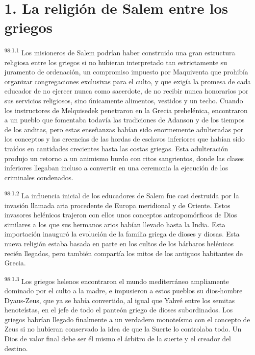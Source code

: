 \section*{1. La religión de Salem entre los griegos}
\par
\textsuperscript{98:1.1} Los misioneros de Salem podrían haber construido una gran estructura religiosa entre los griegos si no hubieran interpretado tan estrictamente su juramento de ordenación, un compromiso impuesto por Maquiventa que prohibía organizar congregaciones exclusivas para el culto, y que exigía la promesa de cada educador de no ejercer nunca como sacerdote, de no recibir nunca honorarios por sus servicios religiosos, sino únicamente alimentos, vestidos y un techo. Cuando los instructores de Melquisedek penetraron en la Grecia prehelénica, encontraron a un pueblo que fomentaba todavía las tradiciones de Adanson y de los tiempos de los anditas, pero estas enseñanzas habían sido enormemente adulteradas por los conceptos y las creencias de las hordas de esclavos inferiores que habían sido traídos en cantidades crecientes hasta las costas griegas. Esta adulteración produjo un retorno a un animismo burdo con ritos sangrientos, donde las clases inferiores llegaban incluso a convertir en una ceremonia la ejecución de los criminales condenados.

\par
\textsuperscript{98:1.2} La influencia inicial de los educadores de Salem fue casi destruida por la invasión llamada aria procedente de Europa meridional y de Oriente. Estos invasores helénicos trajeron con ellos unos conceptos antropomórficos de Dios similares a los que sus hermanos arios habían llevado hasta la India. Esta importación inauguró la evolución de la familia griega de dioses y diosas. Esta nueva religión estaba basada en parte en los cultos de los bárbaros helénicos recién llegados, pero también compartía los mitos de los antiguos habitantes de Grecia.

\par
\textsuperscript{98:1.3} Los griegos helenos encontraron el mundo mediterráneo ampliamente dominado por el culto a la madre, e impusieron a estos pueblos su dios-hombre Dyaus-Zeus, que ya se había convertido, al igual que Yahvé entre los semitas henoteístas, en el jefe de todo el panteón griego de dioses subordinados. Los griegos habrían llegado finalmente a un verdadero monoteísmo con el concepto de Zeus si no hubieran conservado la idea de que la Suerte lo controlaba todo. Un Dios de valor final debe ser él mismo el árbitro de la suerte y el creador del destino.


